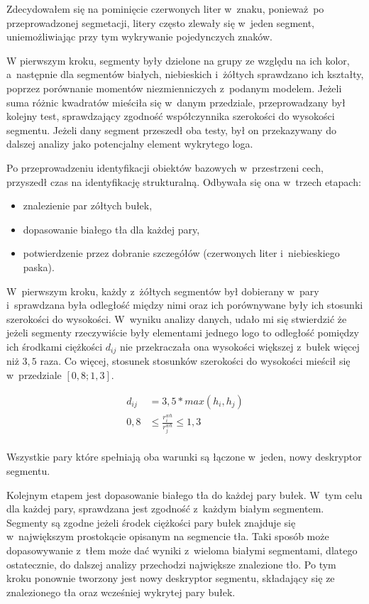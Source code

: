 Zdecydowałem się na pominięcie czerwonych liter w~znaku, ponieważ po przeprowadzonej segmetacji, litery często zlewały się w~jeden segment, uniemożliwiając przy tym wykrywanie pojedynczych znaków. 

W pierwszym kroku, segmenty były dzielone na grupy ze względu na ich kolor, a~następnie dla segmentów białych, niebieskich i~żółtych sprawdzano ich kształty, poprzez porównanie momentów niezmienniczych z~podanym modelem. Jeżeli suma różnic kwadratów mieściła się w~danym przedziale, przeprowadzany był kolejny test, sprawdzający zgodność współczynnika szerokości do wysokości segmentu. Jeżeli dany segment przeszedł oba testy, był on przekazywany do dalszej analizy jako potencjalny element wykrytego loga.

Po przeprowadzeniu identyfikacji obiektów bazowych w~przestrzeni cech, przyszedł czas na identyfikację strukturalną. Odbywała się ona w~trzech etapach:

\begin{itemize}
    \item znalezienie par zółtych bułek,
    \item dopasowanie białego tła dla każdej pary,
    \item potwierdzenie przez dobranie szczegółów (czerwonych liter i~niebieskiego paska).
\end{itemize}

W~pierwszym kroku, każdy z~żółtych segmentów był dobierany w~pary i~sprawdzana była odległość między nimi oraz ich porównywane były ich stosunki szerokości do wysokości.
W~wyniku analizy danych, udało mi się stwierdzić że jeżeli segmenty rzeczywiście były elementami jednego logo to odległość pomiędzy ich środkami ciężkości $d_{ij}$ nie przekraczała ona wysokości większej z~bułek więcej niż $3{,}5$ raza. Co więcej, stosunek stosunków szerokości do wysokości mieścił się w~przedziale $[0{,}8;1{,}3]$.

\begin{equation}
    \begin{aligned}
        d_{ij} &= 3{,}5 * max(h_{i}, h_{j}) \\
        0{,}8 &\leq \frac{r^{wh}_{i}}{r^{wh}_{j}} \leq 1{,}3 \\
    \end{aligned}
    \label{eqn:buns}
\end{equation}

Wszystkie pary które spełniają oba warunki są łączone w~jeden, nowy deskryptor segmentu.

Kolejnym etapem jest dopasowanie białego tła do każdej pary bułek. W~tym celu dla każdej pary, sprawdzana jest zgodność z~każdym białym segmentem. Segmenty są zgodne jeżeli środek ciężkości pary bułek znajduje się w~największym prostokącie opisanym na segmencie tła. Taki sposób może dopasowywanie z~tłem może dać wyniki z~wieloma białymi segmentami, dlatego ostatecznie, do dalszej analizy przechodzi największe znalezione tło. Po tym kroku ponownie tworzony jest nowy deskryptor segmentu, składający się ze znalezionego tła oraz wcześniej wykrytej pary bułek.


